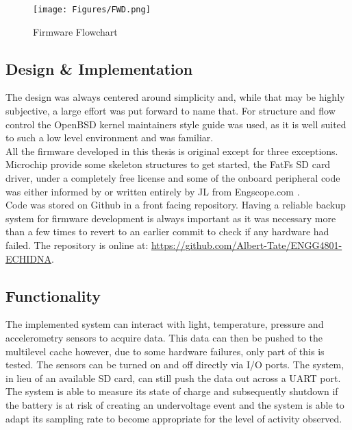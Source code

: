 \documentclass[12pt,openany,a4paper]{book}
\begin{document}
		\begin{figure}[H]
			\centering
			\texttt{[image: Figures/FWD.png]}
			\caption{Firmware Flowchart}
			\label{fig:FWD}
		\end{figure}		

		\newpage
		\subsection{Design \& Implementation} %
		The design was always centered around simplicity and, while that may be highly subjective, a large effort was put forward to name that. For structure and flow control the OpenBSD kernel maintainers style guide \cite{BSDstyle} was used, as it is well suited to such a low level environment and was familiar. \\
		
		All the firmware developed in this thesis is original except for three exceptions. Microchip provide some skeleton structures to get started, the FatFs SD card driver, under a completely free license and some of the onboard peripheral code was either informed by or written entirely by JL from Engscope.com \cite{JL2013}. \\
		
		Code was stored on Github in a front facing repository. Having a reliable backup system for firmware development is always important as it was necessary more than a few times to revert to an earlier commit to check if any hardware had failed. The repository is online at: \url{https://github.com/Albert-Tate/ENGG4801-ECHIDNA}.
		
		\subsection{Functionality}

		The implemented system can interact with light, temperature, pressure and accelerometry sensors to acquire data. This data can then be pushed to the multilevel cache however, due to some hardware failures, only part of this is tested. The sensors can be turned on and off directly via I/O ports. The system, in lieu of an available SD card, can still push the data out across a UART port. The system is able to measure its state of charge and subsequently shutdown if the battery is at risk of creating an undervoltage event and the system is able to adapt its sampling rate to become appropriate for the level of activity observed. \\
		
\end{document}
